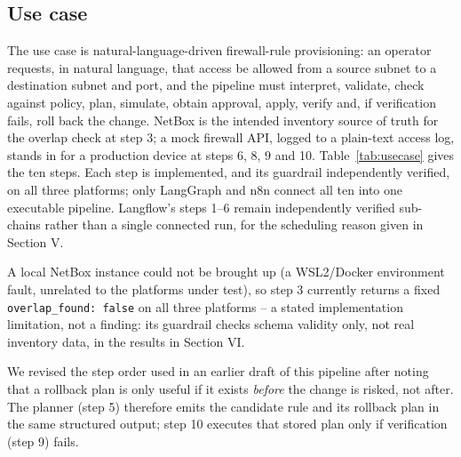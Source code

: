 \documentclass[conference]{IEEEtran}
\begin{document}
\subsection{Use case}
The use case is natural-language-driven firewall-rule provisioning: an operator requests, in natural language, that access be allowed from a source subnet to a destination subnet and port, and the pipeline must interpret, validate, check against policy, plan, simulate, obtain approval, apply, verify and, if verification fails, roll back the change. NetBox is the intended inventory source of truth for the overlap check at step 3; a mock firewall API, logged to a plain-text access log, stands in for a production device at steps 6, 8, 9 and 10. Table~\ref{tab:usecase} gives the ten steps. Each step is implemented, and its guardrail independently verified, on all three platforms; only LangGraph and n8n connect all ten into one executable pipeline. Langflow's steps 1--6 remain independently verified sub-chains rather than a single connected run, for the scheduling reason given in Section V.

A local NetBox instance could not be brought up (a WSL2/Docker environment fault, unrelated to the platforms under test), so step 3 currently returns a fixed \texttt{overlap\_found: false} on all three platforms -- a stated implementation limitation, not a finding: its guardrail checks schema validity only, not real inventory data, in the results in Section VI.

We revised the step order used in an earlier draft of this pipeline after noting that a rollback plan is only useful if it exists \emph{before} the change is risked, not after. The planner (step 5) therefore emits the candidate rule and its rollback plan in the same structured output; step 10 executes that stored plan only if verification (step 9) fails.
\end{document}
